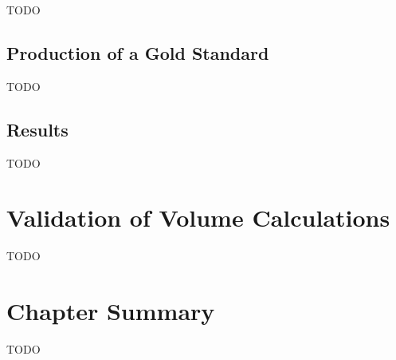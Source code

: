 TODO

\subsection{Production of a Gold Standard}

TODO

\subsection{Results}

TODO

\section{Validation of Volume Calculations}

TODO

\section{Chapter Summary}

TODO

